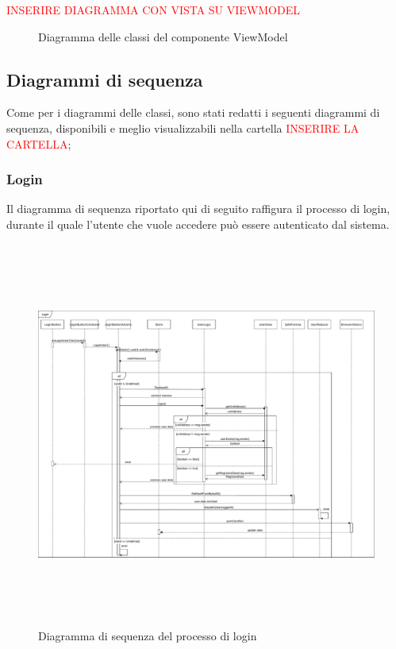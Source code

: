 	{\textcolor{red}{INSERIRE DIAGRAMMA CON VISTA SU VIEWMODEL}}
	\begin{figure}[h]
		\centering
		\caption{Diagramma delle classi del componente ViewModel}
		\label{}
	\end{figure}
	
	\subsection{Diagrammi di sequenza}
	Come per i diagrammi delle classi, sono stati redatti i seguenti diagrammi di sequenza, disponibili e meglio visualizzabili nella cartella {\textcolor{red}{INSERIRE LA CARTELLA}};
	
		\subsubsection{Login}
		Il diagramma di sequenza riportato qui di seguito raffigura il processo di login, durante il quale l'utente che vuole accedere può essere autenticato dal sistema.
		
		\begin{figure}[h]
			\centering
				\includegraphics[height=5in]{./Diagrammi/DiagrammaSequenzaLogin.pdf}
			\caption{Diagramma di sequenza del processo di login}
			\label{}
		\end{figure}
		
